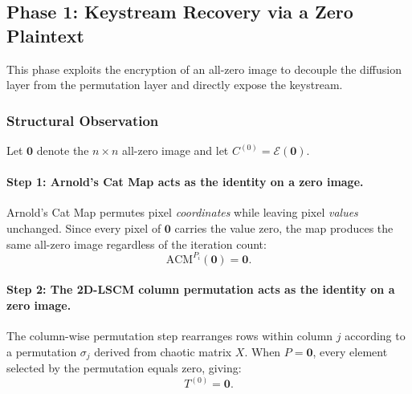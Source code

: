 \subsection{Phase 1: Keystream Recovery via a Zero Plaintext}

This phase exploits the encryption of an all-zero image to decouple the diffusion layer from the permutation layer and directly expose the keystream.

\subsubsection{Structural Observation}

Let $\mathbf{0}$ denote the $n \times n$ all-zero image and let $C^{(0)} = \mathcal{E}(\mathbf{0})$.

\paragraph{Step 1: Arnold's Cat Map acts as the identity on a zero image.}
Arnold's Cat Map permutes pixel \emph{coordinates} while leaving pixel \emph{values} unchanged. Since every pixel of $\mathbf{0}$ carries the value zero, the map produces the same all-zero image regardless of the iteration count:
\begin{equation}
    \mathrm{ACM}^{P_i}(\mathbf{0}) = \mathbf{0}.
\end{equation}

\paragraph{Step 2: The 2D-LSCM column permutation acts as the identity on a zero image.}
The column-wise permutation step rearranges rows within column $j$ according to a permutation $\sigma_j$ derived from chaotic matrix $X$. When $P = \mathbf{0}$, every element selected by the permutation equals zero, giving:
\begin{equation}
    T^{(0)} = \mathbf{0}.
\end{equation}

